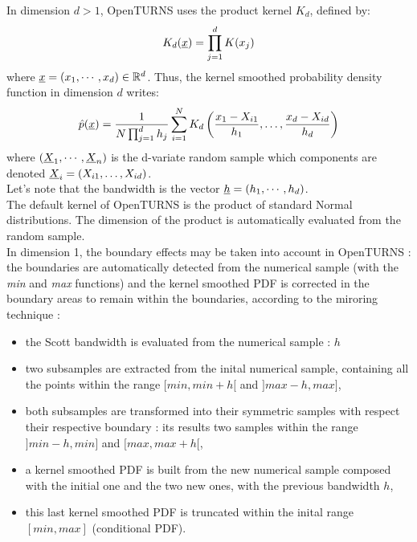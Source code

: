 In dimension $d>1$, OpenTURNS uses the product kernel $K_d$, defined by: 
  \begin{align*}
    K_d({\underline{x}}) = \displaystyle \prod_{j=1}^{d} K(x_j)
  \end{align*}
 where ${\underline{x}} = (x_1, \cdots, x_d)\in {\mathbb R}^d$. Thus, the kernel smoothed probability density function in dimension $d$ writes:
  \begin{align*}
    \hat{p}({\underline{x}}) = \displaystyle \frac{1}{N \prod_{j=1}^{d}h_j} \sum_{i=1}^{N} K_d\left(\frac{x_1 - X_{i1} }{h_1}, \dots, \frac{x_d - X_{id}}{h_d}\right)
  \end{align*}
where $({\underline{X}}_1, \cdots, {\underline{X}}_n)$ is the d-variate random  sample which components are denoted ${\underline{X}}_i = (X_{i1}, \dots, X_{id})$. \\
  Let's note that the bandwidth is the vector ${\underline{h}} = (h_1, \cdots, h_d)$. \\
The default kernel of OpenTURNS is the product of standard Normal distributions. The dimension of the product is automatically evaluated from the random sample.\\

In dimension 1, the boundary effects may be taken into account in OpenTURNS : the boundaries are automatically detected from the numerical sample (with the \textit{min} and \textit{max} functions) and the kernel smoothed PDF is corrected in the boundary areas to remain within the boundaries, according to the miroring technique :
\begin{itemize}
\item the Scott bandwidth is evaluated from the numerical sample : $h$
\item two subsamples are extracted from the inital numerical sample, containing all the points within the range $[min, min + h[$ and  $]max-h, max]$,
\item both subsamples are transformed into their symmetric samples with respect their respective boundary : its results two samples within the range  $]min-h, min]$ and  $[max, max+h[$,
      \item a kernel smoothed PDF is built from the new numerical sample composed with the initial one and the two new ones, with the previous bandwidth $h$,
      \item this last kernel smoothed PDF is truncated within the inital range  $[min, max]$ (conditional PDF).
\end{itemize}
\vspace*{0.1cm}

